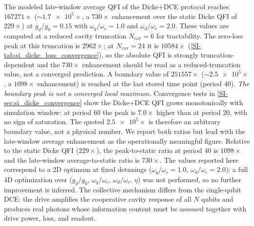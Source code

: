 \documentclass[aps,prxquantum,preprint,superscriptaddress,amsmath,amssymb]{revtex4-2}
\begin{document}
The modeled late-window average QFI of the Dicke+DCE protocol reaches $\num{167271}\times$ ($\sim\!\num{1.7e5}\times$, a $\num{730}\times$ enhancement over the static Dicke QFI of $\num{229}\times$) at $g_d/g_0 = \num{0.15}$ with $\omega_q/\omega_c=\num{1.0}$ and $\omega_d/\omega_c=\num{2.0}$. These values are computed at a reduced cavity truncation $N_{\text{cav}}=\num{6}$ for tractability. The zero-loss peak at this truncation is $\num{2962}\times$; at $N_{\text{cav}}=\num{24}$ it is $\num{10584}\times$ (\cref{SI-tab:si_dicke_loss_convergence}), so the absolute QFI is strongly truncation-dependent and the $\num{730}\times$ enhancement should be read as a reduced-truncation value, not a converged prediction. A boundary value of $\num{251557}\times$ ($\sim\!\num{2.5e5}\times$, a $\num{1098}\times$ enhancement) is reached at the last stored time point (period $\num{40}$). \emph{The boundary peak is not a converged local maximum.} Convergence tests in \cref{SI-sec:si_dicke_convergence} show the Dicke+DCE QFI grows monotonically with simulation window: at period \num{60} the peak is $\num{7.0}\times$ higher than at period \num{20}, with no sign of saturation. The quoted $\num{2.5e5}\times$ is therefore an arbitrary boundary value, not a physical number. We report both ratios but lead with the late-window average enhancement as the operationally meaningful figure. Relative to the static Dicke QFI ($\num{229}\times$), the peak-to-static ratio at period $\num{40}$ is $\num{1098}\times$ and the late-window average-to-static ratio is $\num{730}\times$. The values reported here correspond to a \num{2}D optimum at fixed detunings ($\omega_q/\omega_c=\num{1.0}$, $\omega_d/\omega_c=\num{2.0}$); a full \num{4}D optimization over ($g_d/g_0$, $\omega_q/\omega_c$, $\omega_d/\omega_c$, $\eta$) was not performed, so no further improvement is inferred. The collective mechanism differs from the single-qubit DCE: the drive amplifies the cooperative cavity response of all $N$ qubits and produces real photons whose information content must be assessed together with drive power, loss, and readout.
\end{document}
